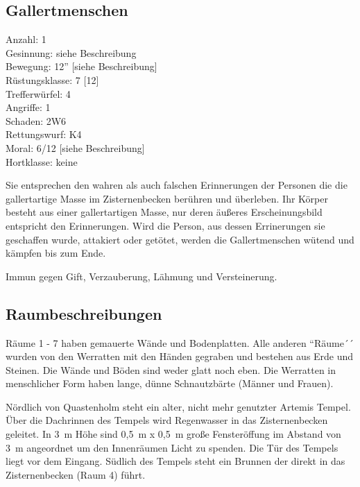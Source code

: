 \subsection{Gallertmenschen}

\begin{tabbing}
Anzahl: 1\\
Gesinnung: siehe Beschreibung\\
Bewegung: 12'' [siehe Beschreibung]\\
Rüstungsklasse: 7 [12]\\
Trefferwürfel: 4\\
Angriffe: 1\\
Schaden: 2W6\\
Rettungswurf: K4\\
Moral: 6/12 [siehe Beschreibung]\\
Hortklasse: keine\\
\end{tabbing}

Sie entsprechen den wahren als auch falschen Erinnerungen der Personen die
die gallertartige Masse im Zisternenbecken berühren und überleben. Ihr
Körper besteht aus einer gallertartigen Masse, nur deren äußeres
Erscheinungsbild entspricht den Erinnerungen. Wird die Person, aus
dessen Errinerungen sie geschaffen wurde, attakiert oder getötet,
werden die Gallertmenschen wütend und kämpfen bis zum Ende.

Immun gegen Gift, Verzauberung, Lähmung und Versteinerung.

\subsection{Raumbeschreibungen}

Räume 1 - 7 haben gemauerte Wände und Bodenplatten. Alle anderen
``Räume´´ wurden von den Werratten mit den Händen gegraben und bestehen
aus Erde und Steinen. Die Wände und Böden sind weder glatt noch eben.
Die Werratten in menschlicher Form haben lange, dünne Schnautzbärte
(Männer und Frauen).

Nördlich von Quastenholm steht ein alter, nicht mehr genutzter
Artemis Tempel. Über die Dachrinnen des Tempels wird Regenwasser
in das Zisternenbecken geleitet. In 3~m Höhe sind 0,5~m x 0,5~m große
Fensteröffung im Abstand von 3~m angeordnet um den Innenräumen Licht zu
spenden. Die Tür des Tempels liegt vor dem Eingang. Südlich des Tempels
steht ein Brunnen der direkt in das Zisternenbecken (Raum 4) führt.


